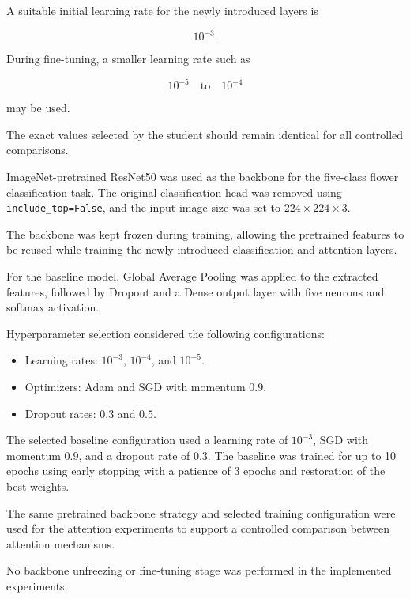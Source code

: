\documentclass[10pt]{article}
\begin{document}
A suitable initial learning rate for the newly introduced layers is

\[
10^{-3}.
\]

During fine-tuning, a smaller learning rate such as

\[
10^{-5}
\quad\text{to}\quad
10^{-4}
\]

may be used.

The exact values selected by the student should remain identical for all
controlled comparisons.




ImageNet-pretrained ResNet50 was used as the backbone for the
five-class flower classification task. The original classification
head was removed using \texttt{include\_top=False}, and the input
image size was set to $224 \times 224 \times 3$.

The backbone was kept frozen during training, allowing the pretrained
features to be reused while training the newly introduced classification
and attention layers.

For the baseline model, Global Average Pooling was applied to the
extracted features, followed by Dropout and a Dense output layer
with five neurons and softmax activation.

Hyperparameter selection considered the following configurations:

\begin{itemize}
    \item Learning rates: $10^{-3}$, $10^{-4}$, and $10^{-5}$.
    \item Optimizers: Adam and SGD with momentum $0.9$.
    \item Dropout rates: $0.3$ and $0.5$.
\end{itemize}

The selected baseline configuration used a learning rate of $10^{-3}$,
SGD with momentum $0.9$, and a dropout rate of $0.3$. The baseline
was trained for up to 10 epochs using early stopping with a patience
of 3 epochs and restoration of the best weights.

The same pretrained backbone strategy and selected training
configuration were used for the attention experiments to support
a controlled comparison between attention mechanisms.

No backbone unfreezing or fine-tuning stage was performed in the
implemented experiments.
\end{document}
